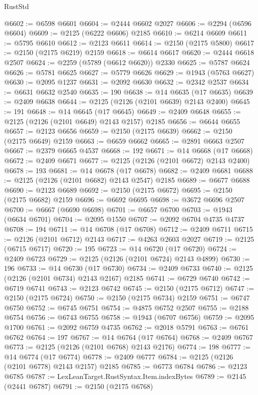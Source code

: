 \begin{lexlean}{RustStd}
\begin{coremodule}
@6602 := @6598 @6601
@6604 := @2444 @6602 @2027
@6606 := @2294 (@6596 @6604)
@6609 := @2125 (@6222 @6606) @2185
@6610 := @6214 @6609
@6611 := @5795 @6610
@6612 := @2123 @6611
@6614 := @2150 (@2175 @5800)
@6617 := @2150 (@2175 @6219) @2159
@6618 := @6614 @6617
@6620 := @2444 @6618 @2507
@6624 := @2259 (@5789 (@6612 @6620)) @2330
@6625 := @5787 @6624
@6626 := @5781 @6625
@6627 := @5779 @6626
@6629 := @1943 (@5763 @6627)
@6630 := @2095 @1237
@6631 := @2092 @6630
@6632 := @2342 @2537
@6634 := @6631 @6632 @2540
@6635 := 190
@6638 := @14 @6635 (@17 @6635)
@6639 := @2409 @6638
@6644 := @2125 (@2126 (@2101 @6639) @2143 @2400)
@6645 := 191
@6648 := @14 @6645 (@17 @6645)
@6649 := @2409 @6648
@6655 := @2125 (@2126 (@2101 @6649) @2143 @2157) @2185
@6656 := @6644 @6655
@6657 := @2123 @6656
@6659 := @2150 (@2175 @6639)
@6662 := @2150 (@2175 @6649) @2159
@6663 := @6659 @6662
@6665 := @2891 @6663 @2507
@6667 := @2379 @6665 @4537
@6668 := 192
@6671 := @14 @6668 (@17 @6668)
@6672 := @2409 @6671
@6677 := @2125 (@2126 (@2101 @6672) @2143 @2400)
@6678 := 193
@6681 := @14 @6678 (@17 @6678)
@6682 := @2409 @6681
@6688 := @2125 (@2126 (@2101 @6682) @2143 @2547) @2185
@6689 := @6677 @6688
@6690 := @2123 @6689
@6692 := @2150 (@2175 @6672)
@6695 := @2150 (@2175 @6682) @2159
@6696 := @6692 @6695
@6698 := @3672 @6696 @2507
@6700 := @6667 (@6690 @6698)
@6701 := @6657 @6700
@6703 := @1943 (@6634 @6701)
@6704 := @2095 @1550
@6707 := @2092 @6704 @4735 @4737
@6708 := 194
@6711 := @14 @6708 (@17 @6708)
@6712 := @2409 @6711
@6715 := @2126 (@2101 @6712) @2143
@6717 := @4263 @2603 @2027
@6719 := @2125 (@6715 @6717)
@6720 := 195
@6723 := @14 @6720 (@17 @6720)
@6724 := @2409 @6723
@6729 := @2125 (@2126 (@2101 @6724) @2143 @4899)
@6730 := 196
@6733 := @14 @6730 (@17 @6730)
@6734 := @2409 @6733
@6740 := @2125 (@2126 (@2101 @6734) @2143 @2167) @2185
@6741 := @6729 @6740
@6742 := @6719 @6741
@6743 := @2123 @6742
@6745 := @2150 (@2175 @6712)
@6747 := @2150 (@2175 @6724)
@6750 := @2150 (@2175 @6734) @2159
@6751 := @6747 @6750
@6752 := @6745 @6751
@6754 := @4875 @6752 @2507
@6755 := @2188 @6754
@6756 := @6743 @6755
@6758 := @1943 (@6707 @6756)
@6759 := @2095 @1700
@6761 := @2092 @6759 @4735
@6762 := @2018 @5791
@6763 := @6761 @6762
@6764 := 197
@6767 := @14 @6764 (@17 @6764)
@6768 := @2409 @6767
@6773 := @2125 (@2126 (@2101 @6768) @2143 @2176)
@6774 := 198
@6777 := @14 @6774 (@17 @6774)
@6778 := @2409 @6777
@6784 := @2125 (@2126 (@2101 @6778) @2143 @2157) @2185
@6785 := @6773 @6784
@6786 := @2123 @6785
@6787 := LexLeanTarget.RustSyntax.Item.indexBytes
@6789 := @2145 (@2441 @6787)
@6791 := @2150 (@2175 @6768)

\end{coremodule}
\end{lexlean}
